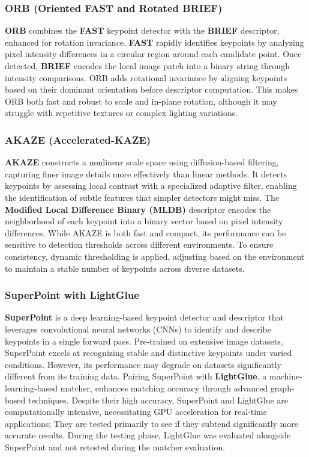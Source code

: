 \subsubsection{ORB (Oriented FAST and Rotated BRIEF)}
\textbf{ORB} combines the \textbf{FAST} keypoint detector with the \textbf{BRIEF} descriptor, enhanced for rotation invariance. \textbf{FAST} rapidly identifies keypoints by analyzing pixel intensity differences in a circular region around each candidate point. Once detected, \textbf{BRIEF} encodes the local image patch into a binary string through intensity comparisons. ORB adds rotational invariance by aligning keypoints based on their dominant orientation before descriptor computation. This makes ORB both fast and robust to scale and in-plane rotation, although it may struggle with repetitive textures or complex lighting variations.

\subsubsection{AKAZE (Accelerated-KAZE)}
\textbf{AKAZE} constructs a nonlinear scale space using diffusion-based filtering, capturing finer image details more effectively than linear methods. It detects keypoints by assessing local contrast with a specialized adaptive filter, enabling the identification of subtle features that simpler detectors might miss. The \textbf{Modified Local Difference Binary (MLDB)} descriptor encodes the neighborhood of each keypoint into a binary vector based on pixel intensity differences. While AKAZE is both fast and compact, its performance can be sensitive to detection thresholds across different environments. To ensure consistency, dynamic thresholding is applied, adjusting based on the environment to maintain a stable number of keypoints across diverse datasets.

\subsubsection{SuperPoint with LightGlue}
\textbf{SuperPoint} is a deep learning-based keypoint detector and descriptor that leverages convolutional neural networks (CNNs) to identify and describe keypoints in a single forward pass. Pre-trained on extensive image datasets, SuperPoint excels at recognizing stable and distinctive keypoints under varied conditions. \cite{rpaultrat2023superpoint} However, its performance may degrade on datasets significantly different from its training data. Pairing SuperPoint with \textbf{LightGlue}, a machine-learning-based matcher, enhances matching accuracy through advanced graph-based techniques. \cite{cvg2023lightglue} Despite their high accuracy, SuperPoint and LightGlue are computationally intensive, necessitating GPU acceleration for real-time applications; They are tested primarily to see if they subtend significantly more accurate results. During the testing phase, LightGlue was evaluated alongside SuperPoint and not retested during the matcher evaluation. 



